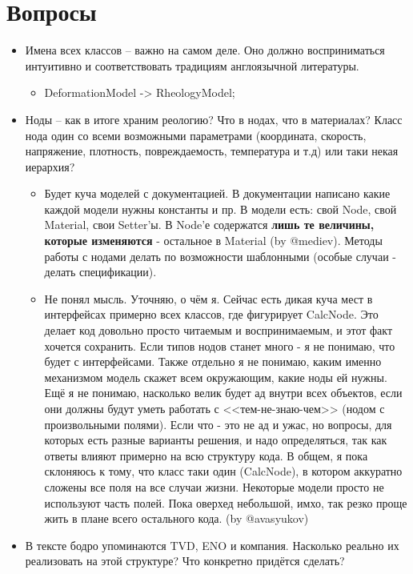 \documentclass[a4paper,12pt]{article}
\numberwithin{equation}{section}
\begin{document}
\section{Вопросы}
	\begin{itemize}
		\item{Имена всех классов -- важно на самом деле. Оно должно восприниматься интуитивно и соответствовать традициям англоязычной литературы.}
		\begin{itemize}
			\item{DeformationModel -> RheologyModel;}
		\end{itemize}
		\item{Ноды -- как в итоге храним реологию? Что в нодах, что в материалах? Класс нода один со всеми возможными параметрами (координата, скорость, напряжение, плотность, повреждаемость, температура и т.д) или таки некая иерархия?}
		\begin{itemize}
			\item{Будет куча моделей с документацией. В документации написано какие каждой модели нужны константы и пр. В модели есть: свой Node, свой Material, свои Setter'ы. В Node'е содержатся \textbf{лишь те величины, которые изменяются} - остальное в Material (by @mediev). Методы работы с нодами делать по возможности шаблонными (особые случаи - делать спецификации).}
			\item{Не понял мысль. Уточняю, о чём я. Сейчас есть дикая куча мест в интерфейсах примерно всех классов, где фигурирует CalcNode. Это делает код довольно просто читаемым и воспринимаемым, и этот факт хочется сохранить. Если типов нодов станет много - я не понимаю, что будет с интерфейсами. Также отдельно я не понимаю, каким именно механизмом модель скажет всем окружающим, какие ноды ей нужны. Ещё я не понимаю, насколько велик будет ад внутри всех объектов, если они должны будут уметь работать с <<тем-не-знаю-чем>> (нодом с произвольными полями). Если что - это не ад и ужас, но вопросы, для которых есть разные варианты решения, и надо определяться, так как ответы влияют примерно на всю структуру кода. В общем, я пока склоняюсь к тому, что класс таки один (CalcNode), в котором аккуратно сложены все поля на все случаи жизни. Некоторые модели просто не используют часть полей. Пока оверхед небольшой, имхо, так резко проще жить в плане всего остального кода. (by @avasyukov)}
		\end{itemize}
		\item{В тексте бодро упоминаются TVD, ENO и компания. Насколько реально их реализовать на этой структуре? Что конкретно придётся сделать?}

\end{itemize}
\end{document}
